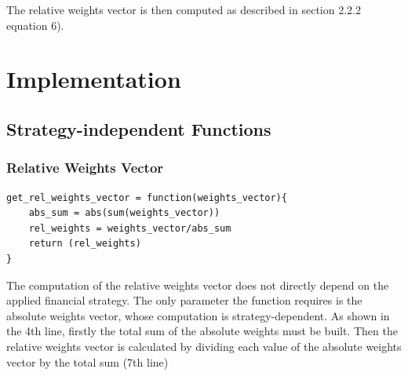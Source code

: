 \documentclass{article}
\begin{document}
The relative weights vector is then computed as described in section 2.2.2 equation 6).

\section{Implementation}
\subsection{Strategy-independent Functions}
\subsubsection{Relative Weights Vector}
\begin{lstlisting}[caption={This example shows how relative weights vector is computed in R.}, label=code:1, frame = single]
get_rel_weights_vector = function(weights_vector){
    abs_sum = abs(sum(weights_vector))
    rel_weights = weights_vector/abs_sum
    return (rel_weights)
}
\end{lstlisting}
The computation of the relative weights vector does not directly depend on the applied financial strategy. The only parameter the function requires is the absolute weights vector, whose computation is strategy-dependent. As shown in the 4th line, firstly the total sum of the absolute weights must be built. Then the relative weights vector is calculated by dividing each value of the absolute weights vector by the total sum (7th line)  
\end{document}
